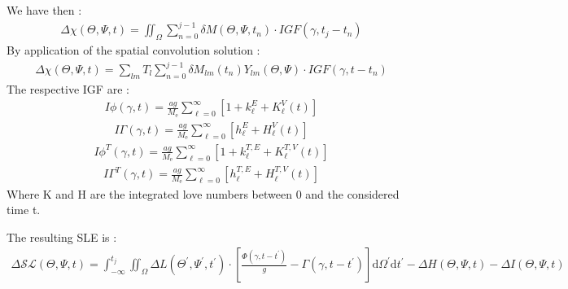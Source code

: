 \documentclass[letterpaper,10pt,english]{sphinxmanual}
\begin{document}
\sphinxAtStartPar
We have then :
\begin{equation*}
\begin{split}\Delta \chi (\Theta,\Psi,t)= \iint_{\Omega} \sum_{n=0}^{j-1} \delta M(\Theta,\Psi,t_n) \cdot I G F\left(\gamma, t_j -t_n \right)\end{split}
\end{equation*}
\sphinxAtStartPar
By application of the spatial convolution solution :
\begin{equation*}
\begin{split}\Delta \chi (\Theta,\Psi,t)= \sum_{lm} T_l \sum_{n=0}^{j-1} \delta M_{lm} (t_n) Y_{lm}(\Theta,\Psi) \cdot I G F\left(\gamma, t-t_n \right)\end{split}
\end{equation*}
\sphinxAtStartPar
The respective IGF are :
\begin{equation*}
\begin{split}I \phi(\gamma, t)=\frac{a g}{M_{\mathrm{e}}} \sum_{\ell=0}^{\infty}\left[1+k_{\ell}^E+ K_{\ell}^V(t)\right]\end{split}
\end{equation*}\begin{equation*}
\begin{split}I \Gamma(\gamma, t)=\frac{a g}{M_{\mathrm{e}}} \sum_{\ell=0}^{\infty}\left[h_{\ell}^E +H_{\ell}^V(t)\right]\end{split}
\end{equation*}\begin{equation*}
\begin{split}I \phi^T(\gamma, t)=\frac{a g}{M_{\mathrm{e}}} \sum_{\ell=0}^{\infty}\left[1+k_{\ell}^{T,E} + K_{\ell}^{T,V}(t)\right]\end{split}
\end{equation*}\begin{equation*}
\begin{split}I \Gamma^T(\gamma, t)=\frac{a g}{M_{\mathrm{e}}} \sum_{\ell=0}^{\infty}\left[h_{\ell}^{T,E}+H_{\ell}^{T,V}(t)\right]\end{split}
\end{equation*}
\sphinxAtStartPar
Where K and H are the integrated love numbers between 0 and the considered time t.

\sphinxAtStartPar
The resulting SLE is :
\begin{equation*}
\begin{split}\Delta \mathcal{SL}(\Theta,\Psi,t) = \int_{-\infty}^{t_j} \iint_\Omega \Delta L (\Theta ^\prime, \Psi ^\prime,t ^\prime) \cdot [\frac{\Phi(\gamma, t - t^\prime)}{g} - \Gamma(\gamma,t-t^\prime)] \mathrm{d} \Omega ^\prime \mathrm{d} t^\prime - \Delta H(\Theta,\Psi,t) - \Delta I(\Theta,\Psi,t)\end{split}
\end{equation*}
\sphinxstepscope
\end{document}
